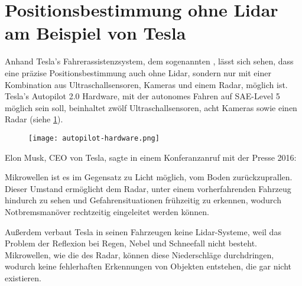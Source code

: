 \section{Positionsbestimmung ohne Lidar am Beispiel von Tesla}\label{section-2-3}

Anhand Tesla's Fahrerassistenzsystem, dem sogenannten , lässt sich sehen, dass eine präzise Positionsbestimmung auch ohne \acs{Lidar}, sondern nur mit einer Kombination aus Ultraschallsensoren, Kameras und einem \acs{Radar}, möglich ist. Tesla's Autopilot 2.0 Hardware, mit der autonomes Fahren auf \ac{SAE}-Level 5 möglich sein soll, beinhaltet zwölf Ultraschallsensoren, acht Kameras sowie einen \acs{Radar} (siehe \ref{autopilot-hardware}).

\begin{figure}\centering
  \texttt{[image: autopilot-hardware.png]}
  \label{autopilot-hardware}
\end{figure}

\noindent Elon Musk, CEO von Tesla, sagte in einem Konferanzanruf mit der Presse 2016: 

Mikrowellen ist es im Gegensatz zu Licht möglich, vom Boden zurückzuprallen. Dieser Umstand ermöglicht dem \acs{Radar}, unter einem vorherfahrenden Fahrzeug hindurch zu sehen und Gefahrensituationen frühzeitig zu erkennen, wodurch Notbremsmanöver rechtzeitig eingeleitet werden können. 

Außerdem verbaut Tesla in seinen Fahrzeugen keine \acs{Lidar}-Systeme, weil das Problem der Reflexion bei Regen, Nebel und Schneefall nicht besteht. Mikrowellen, wie die des \acs{Radar}, können diese Niederschläge durchdringen, wodurch keine fehlerhaften Erkennungen von Objekten entstehen, die gar nicht existieren. 
